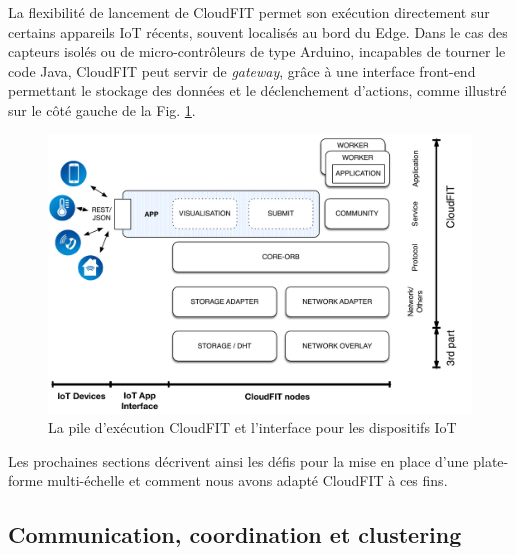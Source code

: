 La flexibilité de lancement de CloudFIT permet son exécution directement sur certains appareils IoT récents, souvent localisés au bord du Edge. Dans le cas des capteurs isolés ou de micro-contrôleurs de type Arduino, incapables de tourner le code Java, CloudFIT peut servir de \textit{gateway}, grâce à une interface front-end permettant le stockage des données et le déclenchement d'actions, comme illustré sur le côté gauche de la Fig. \ref{fig:CloudFit}.


\begin{figure}
	\begin{center}
		\includegraphics[width=1\linewidth]{img/CloudFITstack-IoT}
		\caption{La pile d'exécution CloudFIT et l'interface pour les dispositifs IoT}\label{fig:CloudFit}
	\end{center}
\end{figure}


Les prochaines sections décrivent ainsi les défis pour la mise en place d'une plate-forme multi-échelle et comment nous avons adapté CloudFIT à ces fins.

\subsection{Communication, coordination et clustering}

